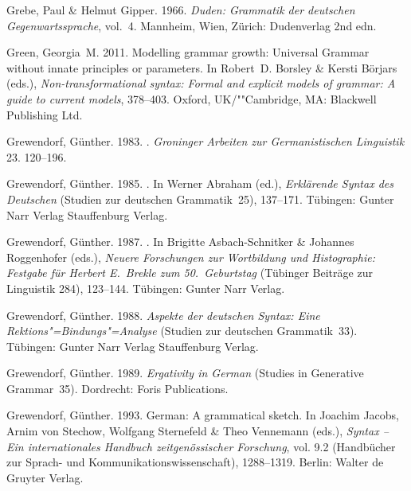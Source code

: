 \begin{thebibliography}{1420}
Grebe, Paul \& Helmut Gipper. 1966.
\newblock \emph{{Duden: Grammatik der deutschen Gegenwartssprache}}, vol.~4.
\newblock Mannheim, Wien, Z{\"u}rich: Dudenverlag 2nd edn.

Green, Georgia~M. 2011.
\newblock Modelling grammar growth: {Universal Grammar} without innate
  principles or parameters.
\newblock In Robert~D. Borsley \& Kersti B{\"o}rjars (eds.),
  \emph{Non-transformational syntax: {Formal} and explicit models of grammar:
  {A} guide to current models}, 378--403. Oxford, UK/""Cambridge, MA: Blackwell
  Publishing Ltd.

Grewendorf, G{\"u}nther. 1983.
.
\newblock \emph{Groninger Arbeiten zur Germanistischen Linguistik} 23.
  120--196.

Grewendorf, G{\"u}nther. 1985.
.
\newblock In Werner Abraham (ed.), \emph{{Erkl{\"a}rende Syntax des Deutschen}}
  (Studien zur deutschen Grammatik~25), 137--171. T{\"u}bingen: \original
  Gunter Narr Verlag \jetzt Stauffenburg Verlag.

Grewendorf, G{\"u}nther. 1987.
.
\newblock In Brigitte Asbach-Schnitker \& Johannes Roggenhofer (eds.),
  \emph{{Neuere Forschungen zur Wortbildung und Histographie: Festgabe f{\"u}r
  Herbert E.\ Brekle zum 50.\ Geburtstag}} (T{\"u}binger Beitr{\"a}ge zur
  Linguistik 284), 123--144. T{\"u}bingen: Gunter Narr Verlag.

Grewendorf, G{\"u}nther. 1988.
\newblock \emph{{Aspekte der deutschen Syntax: Eine
  Rektions"=Bindungs"=Analyse}} (Studien zur deutschen Grammatik~33).
\newblock T{\"u}bingen: \original Gunter Narr Verlag \jetzt Stauffenburg
  Verlag.

Grewendorf, G{\"u}nther. 1989.
\newblock \emph{Ergativity in {German}} (Studies in Generative Grammar~35).
\newblock Dordrecht: Foris Publications.

Grewendorf, G{\"u}nther. 1993.
\newblock German: {A} grammatical sketch.
\newblock In Joachim Jacobs, Arnim {von Stechow}, Wolfgang Sternefeld \& Theo
  Vennemann (eds.), \emph{{Syntax -- Ein internationales Handbuch
  zeit\-gen{\"o}ssischer Forschung}}, vol. 9.2  (Hand\-b{\"u}\-cher zur Sprach-
  und Kommunikationswissenschaft), 1288--1319. Berlin: Walter de Gruyter
  Verlag.


\end{thebibliography}
